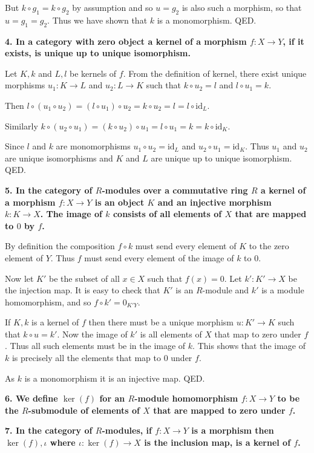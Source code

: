 \documentclass[12pt]{article}
\begin{document}
But $k\circ g_1 = k\circ g_2$ by assumption and so $u = g_2$ is also such a morphism, so that $u = g_1 = g_2$. Thus we have shown that $k$ is a monomorphism. QED.

\textbf{4. In a category with zero object a kernel of a morphism $f : X \to Y$, if it exists, is unique up to unique isomorphism.}

Let $K, k$ and $L, l$ be kernels of $f$. From the definition of kernel, there exist unique morphisms $u_1 : K \to L$ and $u_2 : L \to K$ such that $k\circ u_2 = l$ and $l\circ u_1 = k$.

Then $l\circ(u_1\circ u_2) = (l\circ u_1)\circ u_2 = k\circ u_2 = l = l\circ \mbox{id}_L$.

Similarly $k\circ(u_2\circ u_1) = (k\circ u_2)\circ u_1 = l\circ u_1 = k = k\circ \mbox{id}_K$.

Since $l$ and $k$ are monomorphisms $u_1\circ u_2 = \mbox{id}_L$ and $u_2\circ u_1 = \mbox{id}_K$. Thus $u_1$ and $u_2$ are unique isomorphisms and $K$ and $L$ are unique up to unique isomorphism. QED.
 
\textbf{5. In the category of $R$-modules over a commutative ring $R$ a kernel of a morphism $f : X \to Y$ is an object $K$ and an injective morphism $k : K \to X$. The image of $k$ consists of all elements of $X$ that are mapped to $0$ by $f$.}

By definition the composition $f\circ k$ must send every element of $K$ to the zero element of $Y$. Thus $f$ must send every element of the image of $k$ to $0$.

Now let $K'$ be the subset of all $x \in X$ such that $f(x) = 0$. Let $k' : K' \to X$ be the injection map. It is easy to check that $K'$ is an $R$-module and $k'$ is a module homomorphism, and so $f\circ k' = 0_{K'Y}$.

If $K, k$ is a kernel of $f$ then there must be a unique morphism $u : K' \to K$ such that $k\circ u = k'$. Now the image of $k'$ is all elements of $X$ that map to zero under $f$. Thus all such elements must be in the image of $k$. This shows that the image of $k$ is precisely all the elements that map to $0$ under $f$.

As $k$ is a monomorphism it is an injective map. QED.

\textbf{6. We define $\ker(f)$ for an $R$-module homomorphism $f : X \to Y$ to be the $R$-submodule of elements of $X$ that are mapped to zero under $f$.}

\textbf{7. In the category of $R$-modules, if $f : X \to Y$ is a morphism then $\ker(f), \iota$ where $\iota : \ker(f) \to X$ is the inclusion map, is a kernel of $f$.}
\end{document}
